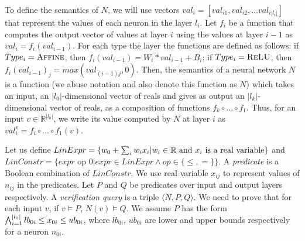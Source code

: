 

To define the semantics of $N$, we will use vectors ${val_i} = [val_{i1}, val_{i2}, ... val_{i|l_i|}]$ that represent the values of each neuron in the layer $l_i$. Let $f_i$ be a function that computes the output vector of values at layer $i$ using the values at layer $i-1$ as $val_i = f_i(val_{i-1})$. For each type the layer the functions are defined as follows: if $Type_i = \textsc{Affine}$, then $f_{i}(val_{i-1}) = W_i * val_{i-1} + B_i$; if $Type_i = \textsc{ReLU}$, then $f_{i}(val_{i-1})_j =  max(val_{{(i-1)}j},0)$. Then, the semantics of a neural network $N$ is a function (we abuse notation and also denote this function as $N$) which takes an input, an $|l_0|$-dimensional vector of reals and gives as output an $|l_k|$-dimensional vector of reals, as a composition of functions $f_k \circ ... \circ f_1$. Thus, for an input $v\in \mathbb{R}^{|l_0|}$, we write its value computed by $N$ at layer $i$ as $val^v_{i}=f_i \circ ... \circ f_1(v)$.

Let us define 
$LinExpr = \{ w_0 + \sum_{i} w_i x_i | w_i \in \mathbb{R} \text{ and } x_i \text{ is a real variable} \}$
and
$LinConstr = \{expr \text{ op } 0 | expr \in LinExpr \land op \in \{\leq, = \}\}$.
A {\em predicate} is a Boolean combination of $LinConstr$.
We use real variable $x_{ij}$ to represent values of $n_{ij}$ in the predicates.
Let $P$ and $Q$ be predicates over input and output layers respectively.
A {\em verification query} is a triple $\langle N, P, Q \rangle$.
We need to prove that for each input ${v}$,
if ${v} \models P$, $N({v}) \models Q$.
We assume $P$ has the form
$\bigwedge_{i=1}^{|l_0|}lb_{0i} \leq x_{0i} \leq ub_{0i}$, where $lb_{0i}$, $ub_{0i}$ are lower and upper bounds respectively for a neuron $n_{0i}$.





